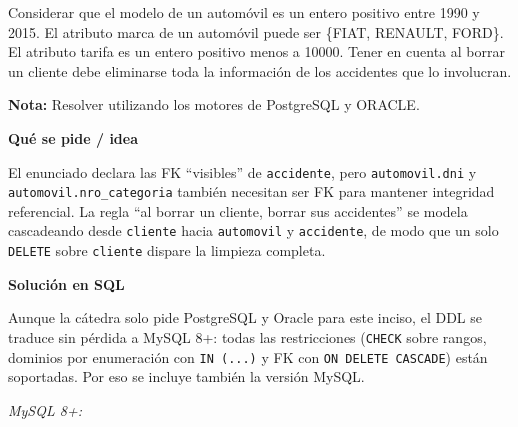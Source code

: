 \documentclass[11pt,a4paper]{article}
\newcommand{\itemcabecera}[1]{\noindent\textbf{#1}\par\medskip}
\newcommand{\bloqueIdea}{\itemcabecera{Qu\'e se pide / idea}}
\newcommand{\bloqueSolucion}{\itemcabecera{Soluci\'on en SQL}}
\begin{document}
Considerar que el modelo de un automóvil es un entero positivo entre 1990 y 2015. El atributo marca de un automóvil puede ser \{FIAT, RENAULT, FORD\}. El atributo tarifa es un entero positivo menos a 10000. Tener en cuenta al borrar un cliente debe eliminarse toda la información de los accidentes que lo involucran.

\textbf{Nota:} Resolver utilizando los motores de PostgreSQL y ORACLE.

\bloqueIdea

El enunciado declara las FK ``visibles'' de \texttt{accidente}, pero \texttt{automovil.dni} y \texttt{automovil.nro\_categoria} también necesitan ser FK para mantener integridad referencial. La regla ``al borrar un cliente, borrar sus accidentes'' se modela cascadeando desde \texttt{cliente} hacia \texttt{automovil} y \texttt{accidente}, de modo que un solo \texttt{DELETE} sobre \texttt{cliente} dispare la limpieza completa.

\bloqueSolucion

Aunque la cátedra solo pide PostgreSQL y Oracle para este inciso, el DDL se traduce sin pérdida a MySQL 8+: todas las restricciones (\texttt{CHECK} sobre rangos, dominios por enumeración con \texttt{IN (...)} y FK con \texttt{ON DELETE CASCADE}) están soportadas. Por eso se incluye también la versión MySQL.

\textit{MySQL 8+:}
\end{document}
